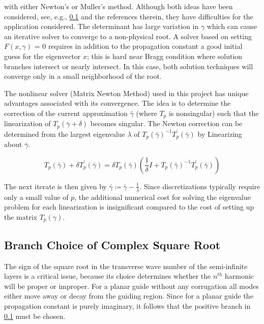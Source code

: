 with either Newton's or Muller's method. Although both ideas have been
considered, see, e.g., \ref{} and the references therein, they have
difficulties for the application considered. The determinant has large
variation in $\gamma$ which can cause an iterative solver to converge
to a non-physical root. A solver based on setting $F(x,\gamma)$ = 0
requires in addition to the propagation constant a good initial guess
for the eigenvector $x$; this is hard near Bragg condition where
solution branches intersect or nearly intersect. In this case, both
solution techniques will converge only in a small neighborhood of the
root.

The nonlinear solver (Matrix Newton Method) used in this project has
unique advantages associated with its convergence. The idea is to
determine the correction of the current approximation $\bar{\gamma}$
(where $T _p$ is nonsingular) such that the linearization of
$T_p(\bar{\gamma}+\delta)$ becomes singular. The Newton correction can
be determined from the largest eigenvalue $\lambda$ of
$T_p(\bar{\gamma})^{-1} T_p^\prime (\bar{\gamma})$ by Linearizing about
$\bar{\gamma}$.

\begin{equation}
T_p(\bar{\gamma})+\delta T_p^\prime (\bar{\gamma}) = \delta T_p(\bar{\gamma})
(\frac{1}{\delta} I + T_p(\bar{\gamma})^{-1} T_p^\prime (\bar{\gamma}))
\end{equation}

The next iterate is then given by
$\bar{\gamma} \coloneqq \bar{\gamma}-\frac{1}{\lambda}$. Since discretizations typically
require only a small value of $p$, the additional numerical cost for
solving the eigenvalue problem for each linearization is insignificant
compared to the cost of setting up the matrix $T_p(\gamma)$.

\subsection{Branch Choice of Complex Square Root}
The sign of the square root in the transverse wave number of the
semi-infinite layers is a critical issue, because its choice
determines whether the $n^{th}$ harmonic will be proper or improper.
For a planar guide without any corrugation all modes either move away
or decay from the guiding region. Since for a planar guide the
propagation constant is purely imaginary, it follows that the positive
branch in \ref{} must be chosen.

